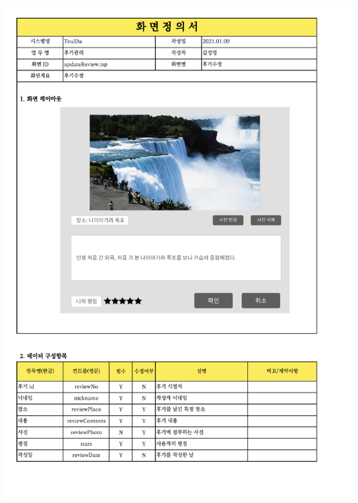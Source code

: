 {{{{{{{{{{{{{{{{{{{{{{{{{{{{{{\includegraphics[width=20cm]{./Figure/Analysis/Display/review/review_05.pdf} \\
}}}}}}}}}}}}}}}}}}}}}}}}}}}}}}
